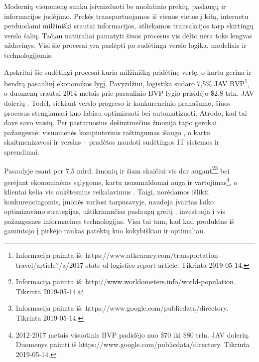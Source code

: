 

Modernią visuomenę sunku įsivaizduoti be nuolatinio prekių, paslaugų ir informacijos judėjimo. Prekės transportuojamos iš vienos vietos į kitą, internetu perduodami milžiniški srautai informacijos, atliekamos transakcijos tarp skirtingų verslo šalių. Tačiau natūraliai pamatyti šiuos procesus vis dėlto nėra toks lengvas uždavinys. Visi šie procesai yra paslėpti po sudėtinga verslo logika, modeliais ir technologijomis. 

Apskritai šie sudėtingi procesai kuria milžinišką pridėtinę vertę, o kartu gerina ir bendrą pasaulinį ekonomikos lygį. Pavyzdžiui, logistika sudaro 7,5\% JAV BVP\footnote{Informacija paimta iš: https://www.atkearney.com/transportation-travel/article?/a/2017-state-of-logistics-report-article. Tikrinta 2019-05-14.}, o duomenų srautai 2014 metais prie pasaulinio BVP lygio prisidėjo \$2.8 trln. JAV dolerių \cite{manyika2016digital}. Todėl, siekiant verslo progreso ir konkurencinio pranašumo, šiuos procesus stengiamasi kuo labiau optimizuoti bei automatizuoti. Atrodo, kad tai davė savo vaisių. Per pastaruosius dešimtmečius žmonija tapo gerokai pažangesnė: visuomenės kompiuterinis raštingumas išaugo \cite{van2015internet}, o kartu skaitmenizavosi ir verslas – pradėtos naudoti sudėtingos IT sistemos ir sprendimai.

Pasaulyje esant per 7,5 mlrd. žmonių ir šiam skaičiui vis dar augant\footnote{Informacija paimta iš: http://www.worldometers.info/world-population. Tikrinta 2019-05-14.}\footnote{\label{note1}Informacija paimta iš: https://www.google.com/publicdata/directory. Tikrinta 2019-05-14.} bei gerėjant ekonominėms sąlygoms, kartu nenumaldomai auga ir vartojimas\footnote{2012-2017 metais visuotinis BVP padidėjo nuo \$70 iki \$80 trln. JAV dolerių. Duomenys paimti iš https://www.google.com/publicdata/directory. Tikrinta 2019-05-14.}, o klientai kelia vis aukštesnius reikalavimus \cite{nilsson2006logistics}. Taigi, norėdamos išlikti konkurencingomis, įmonės varžosi tarpusavyje, naudoja įvairias laiko optimizavimo strategijas, užtikrinančias paslaugų greitį \cite{zacharia2004logistics}, investuoja į vis pažangesnes informacines technologijas. Visa tai tam, kad kad produktas iš gamintojo į pirkėjo rankas patektų kuo kokybiškiau ir optimaliau.

